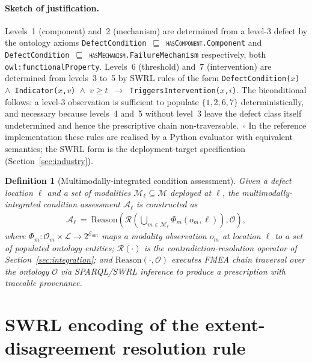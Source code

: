 \documentclass[11pt,a4paper]{article}
\newtheorem{definition}{Definition}
\begin{document}
\paragraph{Sketch of justification.}
Levels~1 (component) and~2 (mechanism) are determined from a
level-3 defect by the ontology axioms
\texttt{DefectCondition $\sqsubseteq$ \textsc{hasComponent}.Component}
and \texttt{DefectCondition $\sqsubseteq$
\textsc{hasMechanism}.FailureMechanism} respectively, both
\texttt{owl:functionalProperty}. Levels~6 (threshold) and~7
(intervention) are determined from levels~3 to~5 by SWRL rules of
the form \texttt{DefectCondition($x$) $\wedge$ Indicator($x$,$v$)
$\wedge$ $v \geq t$ $\to$ TriggersIntervention($x$,$i$)}. The
biconditional follows: a level-3 observation is sufficient to
populate $\{1,2,6,7\}$ deterministically, and necessary because
levels~4 and~5 without level~3 leave the defect class itself
undetermined and hence the prescriptive chain
non-traversable.~$\square$ In the reference implementation these rules are realised by a Python evaluator with equivalent semantics; the SWRL form is the deployment-target specification (Section~\ref{sec:industry}).

\begin{definition}[Multimodally-integrated condition assessment]
\label{def:integrated}
Given a defect location $\ell$ and a set of modalities
$\mathcal{M}_{\ell} \subseteq \mathcal{M}$ deployed at $\ell$, the
\emph{multimodally-integrated condition assessment} $\mathcal{A}_{\ell}$ is
constructed as
\begin{align}
  \mathcal{A}_{\ell} \ =\ \mathrm{Reason}\!\left(
    \mathcal{R}\!\left(\bigcup_{m \in \mathcal{M}_{\ell}}
    \Phi_m(o_m,\ell)
    \right), \mathcal{O}\right),
  \label{eq:integrated}
\end{align}
where $\Phi_m : \mathcal{O}_m \times \mathcal{L} \to
2^{\mathcal{E}_{\text{ont}}}$ maps a modality observation $o_m$
at location $\ell$ to a set of populated ontology entities;
$\mathcal{R}(\cdot)$ is the contradiction-resolution operator of
Section~\ref{sec:integration}; and
$\mathrm{Reason}(\cdot,\mathcal{O})$ executes FMEA chain traversal
over the ontology $\mathcal{O}$ via SPARQL/SWRL inference to
produce a prescription with traceable provenance.
\end{definition}

\section{SWRL encoding of the extent-disagreement resolution rule}
\label{app:swrl}
\end{document}
